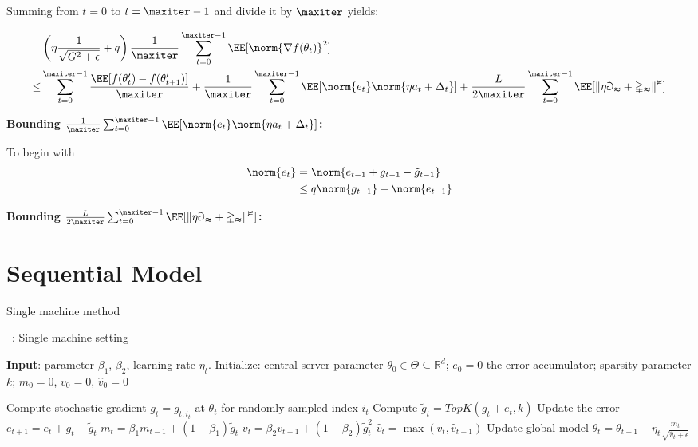 \documentclass[11pt]{article}
\begin{document}
Summing from $t = 0$ to $t = \maxiter -1$ and divide it by $\maxiter$ yields:


\begin{align*}
&  \left( \eta\frac{1}{\sqrt{G^2+\epsilon}} + q \right) \frac{1}{\maxiter}\sum_{t=0}^{\maxiter -1} \EE[\norm{\nabla f(\theta_t)}^2]  \\
\leq &\sum_{t=0}^{\maxiter -1}\frac{\EE[f(\theta_t') -f(\theta_{t+1}')]}{\maxiter}  +  \frac{1}{\maxiter}\sum_{t=0}^{\maxiter -1}  \EE[\norm{e_t}\norm{\eta a_t + \Delta_t}]+  \frac{L}{2\maxiter}\sum_{t=0}^{\maxiter -1} \mathbb \EE[\|\eta a_t + \Delta_t\|^2]
\end{align*} 


\textbf{Bounding $\frac{1}{\maxiter}\sum_{t=0}^{\maxiter -1}  \EE[\norm{e_t}\norm{\eta a_t + \Delta_t}]$:}

To begin with
\begin{align*}
\norm{e_t} & = \norm{e_{t-1} + g_{t-1} - \tilde g_{t-1}}\\
 & \leq q \norm{g_{t-1}} + \norm{e_{t-1}}\\
\end{align*}

\textbf{Bounding $\frac{L}{2\maxiter}\sum_{t=0}^{\maxiter -1} \mathbb \EE[\|\eta a_t + \Delta_t\|^2]$:}


\section{Sequential Model}

Single machine method

\begin{algorithm}[H]
\caption{\algo\ : Single machine setting} \label{alg:sparsamssingle}
\begin{algorithmic}[1]

\STATE \textbf{Input}: parameter $\beta_1$, $\beta_2$, learning rate $\eta_t$. 
\STATE Initialize: central server parameter $\theta_{0} \in \Theta \subseteq \mathbb R^d$; $e_{0}=0$ the error accumulator; sparsity parameter $k$; $m_0=0$, $v_0=0$, $\hat v_0=0$

\STATE  Compute stochastic gradient $g_{t} = g_{t,i_t}$ at $\theta_t$ for randomly sampled index $i_t$
\STATE  Compute $\tilde g_{t}=TopK(g_{t}+e_{t},k)$ \label{line:topksingle} 
\STATE  Update the error $e_{t+1}=e_{t}+g_{t}-\tilde g_{t}$
\STATE $m_t=\beta_1 m_{t-1}+(1-\beta_1)\tilde g_t$
\STATE $v_t=\beta_2 v_{t-1}+(1-\beta_2)\tilde g_t^2$
\STATE $\hat v_t=\max(v_t,\hat v_{t-1})$ \label{line:vsingle}
\STATE Update global model $\theta_t=\theta_{t-1}-\eta_t\frac{m_t}{\sqrt{\hat v_t+\epsilon}}$

\ENDFOR
\end{algorithmic}
\end{algorithm}
\end{document}
